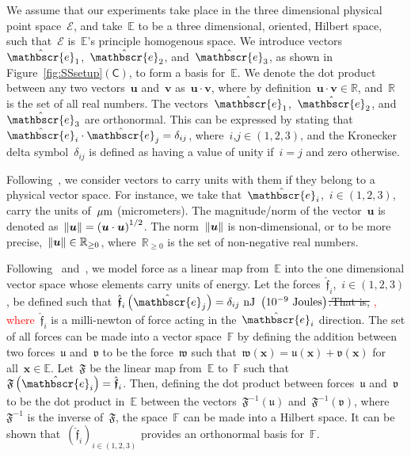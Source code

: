 \documentclass[preprint,10pt,times]{elsarticle}
\numberwithin{equation}{section}
\newcommand{\physe}{\hat{\mathbscr{e}}} %
\newcommand{\physf}{\hat{\boldsymbol{\mathfrak{f}}}}
\renewcommand{\u}[1]{\boldsymbol{#1}}
\newcommand{\pr}[1]{\left( #1 \right)}
\newcommand{\norm}[1]{\ensuremath \lVert #1 \rVert}
\newcommand{\subf}[1]{\pr{\textsf{#1}}}
\begin{document}
We assume that our experiments take place in the three dimensional
physical point space~$\mathcal{E}$, and take~$\mathbb{E}$ to be
a three dimensional, oriented, Hilbert space, such that~$\mathcal{E}$
is~$\mathbb{E}$'s principle homogenous space. We introduce vectors~$\physe_1$,~$\physe_2$,
and~$\physe_3$, as shown in Figure~\ref{fig:SSsetup}$\subf{C}$,
to form a basis for~$\mathbb{E}$. We denote the dot product between
any two vectors~$\u{u}$ and~$\u{v}$ as~$\u{u}\cdot\u{v}$, where
by definition~$\u{u}\cdot\u{v}\in\mathbb{R}$, and~$\mathbb{R}$
is the set of all real numbers. The vectors~$\physe_1$,~$\physe_2$,
and~$\physe_3$ are orthonormal. This can be expressed by stating
that~$\physe_i\cdot\physe_j=\delta_{ij}$, where~$i$,$j\in (1,2,3)$,
and the Kronecker delta symbol~$\delta_{ij}$ is defined as having
a value of unity if~$i=j$ and zero otherwise.

Following~\cite{masiur2019accelerometer}, we consider vectors to
carry units with them if they belong to a physical vector space. For
instance, we take that~$\physe_i$,~$i\in(1,2,3)$, carry the units
of~$\rm\mu m$ (micrometers). The magnitude/norm of the vector~$\u{u}$
is denoted as~$\norm{\u{u}}=\pr{\u{u}\cdot\u{u}}^{1/2}$. The norm~$\norm{\u{u}}$
is non-dimensional, or to be more precise,~$\norm{\u{u}}\in\mathbb{R}_{\ge 0}$,
where~$\mathbb{R}_{\ge 0}$ is the set of non-negative real numbers.

Following~\cite{masiur2019accelerometer} and~\cite{deng2020angle},
we model force as a linear map from~$\mathbb{E}$ into the one dimensional
vector space whose elements carry units of energy. Let the forces~$\physf_i$,~$i\in(1,2,3)$,
be defined such that~$\physf_i\pr{\physe_j}=\delta_{ij}~\text{nJ}~\pr{10^{-9}~\text{Joules}}$\sout{.That is,} \textcolor{red}{, where}~$\physf_i$ is a milli-newton of force acting in the~$\physe_i$
direction. The set of all forces can be made into a vector space~$\mathbb{F}$
by defining the addition between two forces~$\mathfrak{u}$ and~$\mathfrak{v}$
to be the force~$\mathfrak{w}$ such that~$\mathfrak{w}(\u{x})=\mathfrak{u}(\u{x})+\mathfrak{v}(\u{x})$
for all~$\u{x}\in\mathbb{E}$. Let~$\mathfrak{F}$ be the linear
map from~$\mathbb{E}$ to~$\mathbb{F}$ such that~$\mathfrak{F}\pr{\physe_i}=\physf_i$.
Then, defining the dot product between forces~$\mathfrak{u}$ and~$\mathfrak{v}$
to be the dot product in~$\mathbb{E}$ between the vectors~$\mathfrak{F}^{-1}(\mathfrak{u})$
and~$\mathfrak{F}^{-1}(\mathfrak{v})$, where~$\mathfrak{F}^{-1}$
is the inverse of~$\mathfrak{F}$, the space~$\mathbb{F}$ can be
made into a Hilbert space. It can be shown that~$\pr{\physf_i}_{i\in(1,2,3)}$
provides an orthonormal basis for~$\mathbb{F}$.
\end{document}
